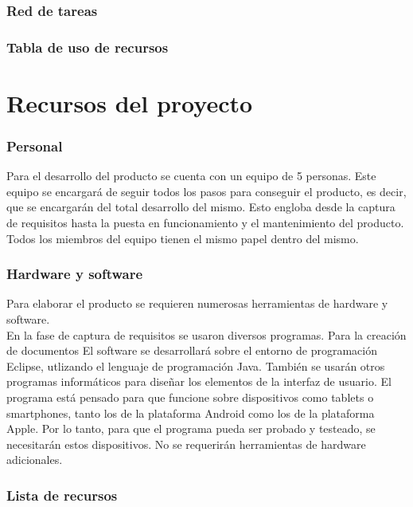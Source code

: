 \documentclass[spanish,a4paper,12pt]{report}	%
\begin{document}
	\section{Red de tareas}

	\section{Tabla de uso de recursos}

\newpage
\mbox{}
\thispagestyle{empty}						%
\newpage
\setcounter{section}{0}

\part{Recursos del proyecto}

	\section{Personal}
		Para el desarrollo del producto se cuenta con un equipo de 5 personas. Este equipo se encargará de seguir todos los pasos para conseguir el producto, es decir,
		 que se encargarán del total desarrollo del mismo. Esto engloba desde la captura de requisitos hasta la puesta en funcionamiento y el mantenimiento del 
		 producto. Todos los miembros del equipo tienen el mismo papel dentro del mismo.
	\section{Hardware y software}
		Para elaborar el producto se requieren numerosas herramientas de hardware y software.  \\
		En la fase de captura de requisitos se usaron diversos programas. Para la creación de documentos
		El software se desarrollará sobre el entorno de programación Eclipse, utlizando el lenguaje de programación Java. También se usarán otros programas informáticos 
		para diseñar los elementos de la interfaz de usuario. El programa está pensado para que funcione sobre dispositivos como tablets o smartphones, 
		tanto los de la plataforma Android como los de la plataforma Apple. Por lo tanto, para que el programa pueda ser probado y testeado, 
		se necesitarán estos dispositivos. No se requerirán herramientas de hardware adicionales.

	\section{Lista de recursos}
\end{document}
